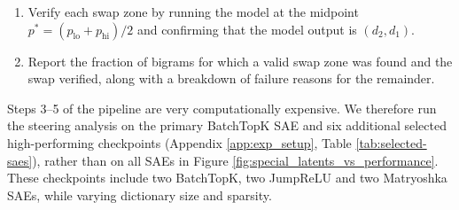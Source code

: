\begin{enumerate}
    \item Verify each swap zone by running the model at the midpoint 
    $p^* = (p_{\mathrm{lo}} + p_{\mathrm{hi}})/2$ and confirming that the model 
    output is $(d_2, d_1)$.
    
    \item Report the fraction of bigrams for which a valid swap zone was found and 
    the swap verified, along with a breakdown of failure reasons for the remainder.
\end{enumerate}
Steps 3--5 of the pipeline are very computationally expensive. We therefore run the steering analysis on the primary BatchTopK SAE and six additional selected high-performing checkpoints (Appendix \ref{app:exp_setup}, Table \ref{tab:selected-saes}), rather than on all SAEs in Figure \ref{fig:special_latents_vs_performance}. These checkpoints include two BatchTopK, two JumpReLU and two Matryoshka SAEs, while varying dictionary size and sparsity.


